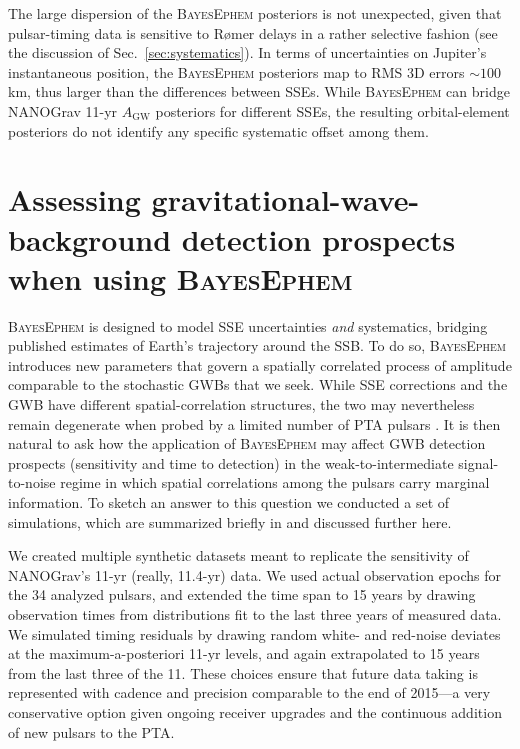 \documentclass{aastex63}
\begin{document}
The large dispersion of the \textsc{BayesEphem} posteriors is not unexpected, given that pulsar-timing data is sensitive to R{\o}mer delays in a rather selective fashion (see the discussion of Sec.\ \ref{sec:systematics}).
In terms of uncertainties on Jupiter's instantaneous position, the \textsc{BayesEphem} posteriors map to RMS 3D errors $\sim 100$ km, thus larger than the differences between SSEs. While \textsc{BayesEphem} can bridge NANOGrav 11-yr $A_\mathrm{GW}$ posteriors for different SSEs, the resulting orbital-element posteriors %
do not identify any specific systematic offset among them.

\section{Assessing gravitational-wave-background detection prospects when using \textsc{BayesEphem}}
\label{sec:simulations}

\textsc{BayesEphem} is designed to model SSE uncertainties \emph{and} systematics, bridging published estimates of Earth's trajectory around the SSB.
To do so, \textsc{BayesEphem} introduces new parameters that govern a spatially correlated process of amplitude comparable to the stochastic GWBs that we seek.
While SSE corrections and the GWB have different spatial-correlation structures, the two may nevertheless remain degenerate when probed by a limited number of PTA pulsars \citep{2019ApJ...876...55R}.
It is then natural to ask how the application of \textsc{BayesEphem} may affect GWB detection prospects (sensitivity and time to detection) in the weak-to-intermediate signal-to-noise regime in which spatial correlations among the pulsars carry marginal information.
To sketch an answer to this question we conducted a set of simulations, which are summarized briefly in \cite{2018ApJ...859...47A} and discussed further here.

We created multiple synthetic datasets meant to replicate the sensitivity of NANOGrav's 11-yr (really, 11.4-yr) data. We used actual observation epochs for the 34 analyzed pulsars, and extended the time span to 15 years by drawing observation times from distributions fit to the last three years of measured data.
We simulated timing residuals by drawing random white- and red-noise deviates at the maximum-a-posteriori 11-yr levels, and again extrapolated to 15 years from the last three of the 11.
These choices ensure that future data taking is represented with cadence and precision comparable to the end of 2015---a very conservative option given ongoing receiver upgrades and the continuous addition of new pulsars to the PTA.
\end{document}
